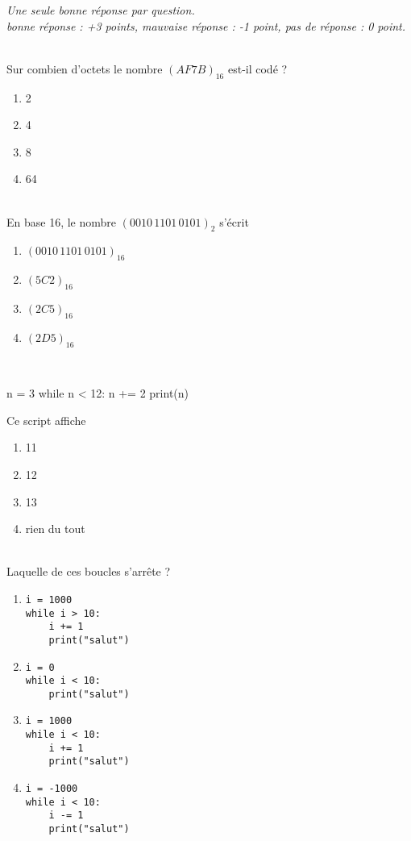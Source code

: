 \documentclass[a4paper,10pt]{article}
\begin{document}
\begin{center}
\textit{Une seule bonne réponse par question.\\
bonne réponse : +3 points, mauvaise réponse : -1 point, pas de réponse : 0 point.
}\end{center}

\ligne\\

Sur combien d'octets le nombre $(AF7B)_{16}$ est-il codé ?
	\begin{enumerate}[\case\ ]
	\item 2
	\item 4
	\item 8
	\item 64
\end{enumerate}	
\ligne\\

En base 16, le nombre $(0010\,1101\,0101)_2$ s'écrit

	\begin{enumerate}[\case\ ]
	\item $(0010\,1101\,0101)_{16}$
	\item $(5C2)_{16}$
	\item $(2C5)_{16}$
	\item $(2D5)_{16}$
\end{enumerate}	
 \ligne\\
 
\begin{pythoncode}
n = 3
while n < 12:
    n += 2
print(n)
\end{pythoncode}
Ce script affiche
\begin{enumerate}[\case\ ]
	\item 11
	\item 12
	\item 13
	\item rien du tout
\end{enumerate}	
\ligne\\

Laquelle de ces boucles s'arrête ?

\begin{enumerate}[\case\ ]
    \item \begin{verbatim}
i = 1000
while i > 10:
    i += 1
    print("salut")
\end{verbatim}
    \item \begin{verbatim}
i = 0
while i < 10:
    print("salut")  
\end{verbatim}
    \item \begin{verbatim}
i = 1000
while i < 10:
    i += 1
    print("salut")
\end{verbatim}
    \item \begin{verbatim}
i = -1000
while i < 10:
    i -= 1
    print("salut")
\end{verbatim}
\end{enumerate}
\ligne\\
\end{document}
